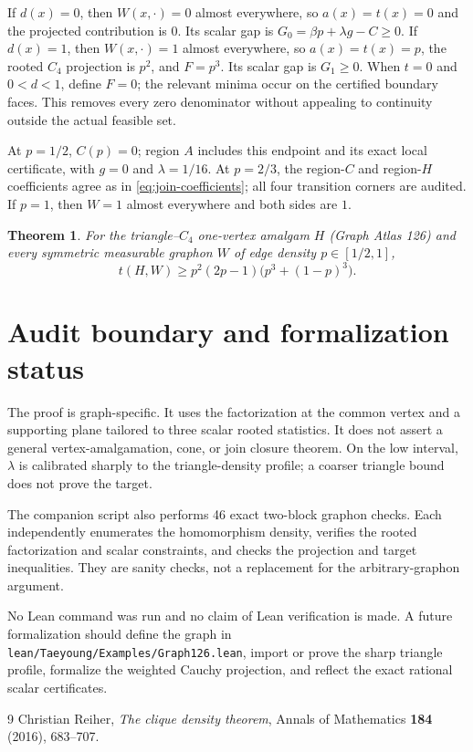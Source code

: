 \documentclass[11pt]{article}
\newtheorem{theorem}{Theorem}[section]
\begin{document}
If $d(x)=0$, then $W(x,\cdot)=0$ almost everywhere, so $a(x)=t(x)=0$ and
the projected contribution is $0$.  Its scalar gap is
$G_0=\beta p+\lambda g-C\ge0$.  If $d(x)=1$, then
$W(x,\cdot)=1$ almost everywhere, so $a(x)=t(x)=p$, the rooted $C_4$
projection is $p^2$, and $F=p^3$.  Its scalar gap is $G_1\ge0$.
When $t=0$ and $0<d<1$, define $F=0$; the relevant minima occur on the
certified boundary faces.  This removes every zero denominator without
appealing to continuity outside the actual feasible set.

At $p=1/2$, $C(p)=0$; region $A$ includes this endpoint and its exact local
certificate, with $g=0$ and $\lambda=1/16$.  At $p=2/3$, the region-$C$ and
region-$H$ coefficients agree as in \eqref{eq:join-coefficients}; all four
transition corners are audited.  If $p=1$, then $W=1$ almost everywhere and
both sides are $1$.

\begin{theorem}
For the triangle--$C_4$ one-vertex amalgam $H$ (Graph Atlas 126) and every
symmetric measurable graphon $W$ of edge density $p\in[1/2,1]$,
\[
 t(H,W)\ge p^2(2p-1)\bigl(p^3+(1-p)^3\bigr).
\]
\end{theorem}

\section{Audit boundary and formalization status}

The proof is graph-specific.  It uses the factorization at the common vertex
and a supporting plane tailored to three scalar rooted statistics.  It does
not assert a general vertex-amalgamation, cone, or join closure theorem.  On
the low interval, $\lambda$ is calibrated sharply to the triangle-density
profile; a coarser triangle bound does not prove the target.

The companion script also performs 46 exact two-block graphon checks.  Each
independently enumerates the homomorphism density, verifies the rooted
factorization and scalar constraints, and checks the projection and target
inequalities.  They are sanity checks, not a replacement for the
arbitrary-graphon argument.

No Lean command was run and no claim of Lean verification is made.  A future
formalization should define the graph in
\texttt{lean/Taeyoung/Examples/Graph126.lean}, import or prove the sharp
triangle profile, formalize the weighted Cauchy projection, and reflect the
exact rational scalar certificates.

\begin{thebibliography}{9}
Christian Reiher,
\emph{The clique density theorem},
Annals of Mathematics \textbf{184} (2016), 683--707.
\end{thebibliography}
\end{document}
